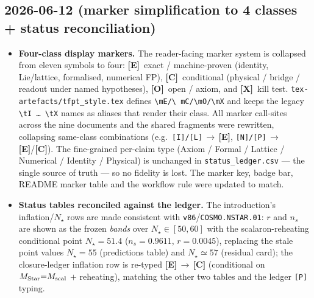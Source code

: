 \documentclass[11pt]{article}
\providecommand{\mE}{\textbf{[E]}}\providecommand{\mC}{\textbf{[C]}}
\providecommand{\mO}{\textbf{[O]}}\providecommand{\mX}{\textbf{[X]}}
\providecommand{\vref}[1]{\texttt{#1}}
\begin{document}
\subsection*{2026-06-12 (marker simplification to 4 classes + status reconciliation)}
\begin{itemize}
\item \textbf{Four-class display markers.} The reader-facing marker system is collapsed from eleven
  symbols to four: \mE\ exact / machine-proven (identity, Lie/lattice, formalised, numerical FP),
  \mC\ conditional (physical / bridge / readout under named hypotheses), \mO\ open / axiom, and \mX\
  kill test. \texttt{tex-artefacts/tfpt\_style.tex} defines \texttt{\textbackslash mE/\textbackslash
  mC/\textbackslash mO/\textbackslash mX} and keeps the legacy \texttt{\textbackslash tI \ldots
  \textbackslash tX} names as aliases that render their class. All marker call-sites across the nine
  documents and the shared fragments were rewritten, collapsing same-class combinations (e.g.\
  \texttt{[I]/[L]}\,$\to$\,\mE, \texttt{[N]/[P]}\,$\to$\,\mE/\mC). The fine-grained per-claim type
  (Axiom / Formal / Lattice / Numerical / Identity / Physical) is unchanged in
  \texttt{status\_ledger.csv} --- the single source of truth --- so no fidelity is lost. The marker key,
  badge bar, README marker table and the workflow rule were updated to match.
\item \textbf{Status tables reconciled against the ledger.} The introduction's inflation/$N_\star$ rows
  are made consistent with \vref{v86}/\texttt{COSMO.NSTAR.01}: $r$ and $n_s$ are shown as the frozen
  \emph{bands} over $N_\star\in[50,60]$ with the scalaron-reheating conditional point $N_\star{=}51.4$
  ($n_s{=}0.9611$, $r{=}0.0045$), replacing the stale point values $N_\star{=}55$ (predictions table)
  and $N_\star\simeq57$ (residual card); the closure-ledger inflation row is re-typed \mE\,$\to$\,\mC
  (conditional on $M_{\rm Star}{=}M_{\rm scal}$ $+$ reheating), matching the other two tables and the
  ledger \texttt{[P]} typing.
\end{itemize}
\end{document}
